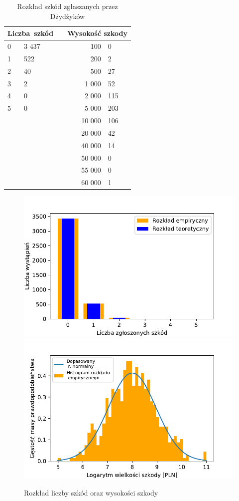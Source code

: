 \documentclass[12pt, a4paper, oneside]{mwart} %
\begin{document}
\begin{table}
\centering
\caption{Rozkład szkód zgłaszanych przez Dżydżyków}
\label{r_szkod}
\begin{tabular}{p{1cm}|l||c||r|l}
\multicolumn{2}{c||}{Liczba~szkód}&\hspace{1cm}&\multicolumn{2}{c}{Wysokość szkody}\\ \hline
0&3 437& \hspace{1cm} & 100&0\\
1&522& \hspace{1cm} & 200&2\\
2&40& \hspace{1cm} & 500&27\\
3&2& \hspace{1cm} & 1 000&52\\
4&0& \hspace{1cm} & 2 000&115\\
5&0& \hspace{1cm} & 5 000&203\\
&&&10 000&106\\
&&&20 000&42\\
&&&40 000&14\\
&&&50 000&0\\
&&&55 000&0\\
&&&60 000&1\\
\end{tabular}
\end{table}

\begin{figure}
\includegraphics[width = 0.49 \textwidth]{wykresy/rozklad_l_szkod.pdf}
\hfill
\includegraphics[width = 0.49 \textwidth]{wykresy/rozklad_wys_szkody.pdf}
\caption{Rozkład liczby szkód oraz wysokości szkody}
\label{rozklad_szkod}
\end{figure}
\end{document}
